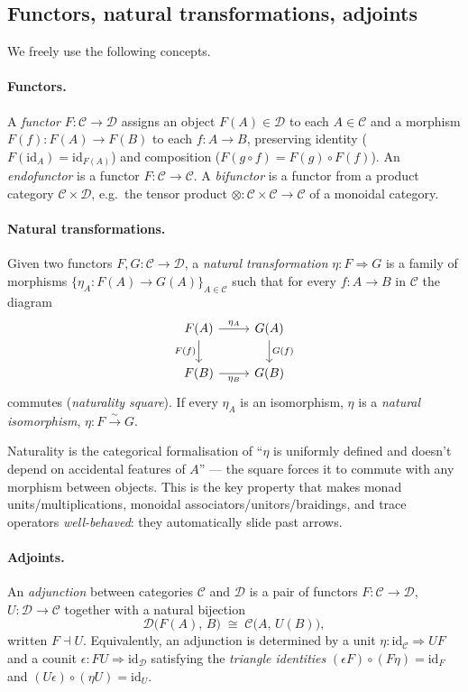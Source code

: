 \documentclass[11pt]{article}
\newcommand{\id}{\mathrm{id}}
\begin{document}
\subsection{Functors, natural transformations, adjoints}

We freely use the following concepts.

\paragraph{Functors.}
A \emph{functor} $F : \mathcal{C} \to \mathcal{D}$ assigns an object
$F(A) \in \mathcal{D}$ to each $A \in \mathcal{C}$ and a morphism
$F(f) : F(A) \to F(B)$ to each $f : A \to B$, preserving identity
($F(\id_A) = \id_{F(A)}$) and composition
($F(g \circ f) = F(g) \circ F(f)$).  An \emph{endofunctor} is a
functor $F : \mathcal{C} \to \mathcal{C}$.  A \emph{bifunctor} is a
functor from a product category $\mathcal{C} \times \mathcal{D}$,
e.g.\ the tensor product $\otimes : \mathcal{C} \times \mathcal{C}
\to \mathcal{C}$ of a monoidal category.

\paragraph{Natural transformations.}
Given two functors $F, G : \mathcal{C} \to \mathcal{D}$, a
\emph{natural transformation} $\eta : F \Rightarrow G$ is a family of
morphisms $\{\eta_A : F(A) \to G(A)\}_{A \in \mathcal{C}}$ such that
for every $f : A \to B$ in $\mathcal{C}$ the diagram
\[
\begin{tikzcd}
  F(A) \arrow[r, "\eta_A"] \arrow[d, "F(f)"'] & G(A) \arrow[d, "G(f)"] \\
  F(B) \arrow[r, "\eta_B"']                   & G(B)
\end{tikzcd}
\]
commutes (\emph{naturality square}).  If every $\eta_A$ is an
isomorphism, $\eta$ is a \emph{natural isomorphism},
$\eta : F \xrightarrow{\sim} G$.

Naturality is the categorical formalisation of ``$\eta$ is uniformly
defined and doesn't depend on accidental features of $A$'' --- the
square forces it to commute with any morphism between objects.  This
is the key property that makes monad units/multiplications,
monoidal associators/unitors/braidings, and trace operators
\emph{well-behaved}: they automatically slide past arrows.

\paragraph{Adjoints.}
An \emph{adjunction} between categories $\mathcal{C}$ and
$\mathcal{D}$ is a pair of functors $F : \mathcal{C} \to \mathcal{D}$,
$U : \mathcal{D} \to \mathcal{C}$ together with a natural bijection
\[
  \mathcal{D}\bigl(F(A),\, B\bigr) \;\cong\; \mathcal{C}\bigl(A,\, U(B)\bigr),
\]
written $F \dashv U$.  Equivalently, an adjunction is determined by a
unit $\eta : \id_\mathcal{C} \Rightarrow U F$ and a counit
$\epsilon : F U \Rightarrow \id_\mathcal{D}$ satisfying the
\emph{triangle identities}
$(\epsilon F) \circ (F \eta) = \id_F$ and
$(U \epsilon) \circ (\eta U) = \id_U$.
\end{document}
